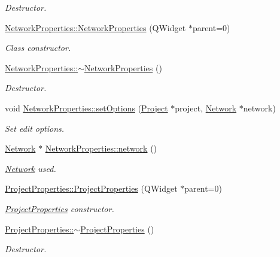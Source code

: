 \begin{DoxyCompactItemize}
\begin{DoxyCompactList}\small\item\em Destructor. \end{DoxyCompactList}\item 
\hyperlink{group___window_ga3d9dac6454f6e722360d9d77af85e4ce}{Network\+Properties\+::\+Network\+Properties} (Q\+Widget $\ast$parent=0)
\begin{DoxyCompactList}\small\item\em Class constructor. \end{DoxyCompactList}\item 
\hyperlink{group___window_ga097b617788eebe80236c0041f8293422}{Network\+Properties\+::$\sim$\+Network\+Properties} ()
\begin{DoxyCompactList}\small\item\em Destructor. \end{DoxyCompactList}\item 
void \hyperlink{group___window_ga9dd17216f65e1c35012699e13547d984}{Network\+Properties\+::set\+Options} (\hyperlink{class_project}{Project} $\ast$project, \hyperlink{class_network}{Network} $\ast$network)
\begin{DoxyCompactList}\small\item\em Set edit options. \end{DoxyCompactList}\item 
\hyperlink{class_network}{Network} $\ast$ \hyperlink{group___window_gac166b4624361fe4f3003bbe5553ad18b}{Network\+Properties\+::network} ()
\begin{DoxyCompactList}\small\item\em \hyperlink{class_network}{Network} used. \end{DoxyCompactList}\item 
\hyperlink{group___window_gad98f3b25db75d19fc7d99b65157fc3f0}{Project\+Properties\+::\+Project\+Properties} (Q\+Widget $\ast$parent=0)
\begin{DoxyCompactList}\small\item\em \hyperlink{class_project_properties}{Project\+Properties} constructor. \end{DoxyCompactList}\item 
\hyperlink{group___window_ga8e0d4371b770784e85648926ded1f70a}{Project\+Properties\+::$\sim$\+Project\+Properties} ()
\begin{DoxyCompactList}\small\item\em Destructor. \end{DoxyCompactList}\item 

\end{DoxyCompactItemize}
